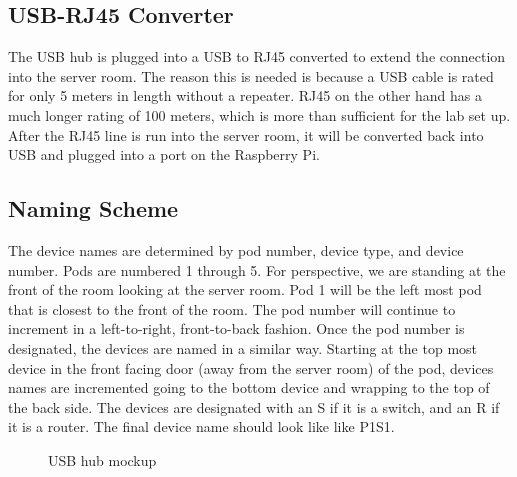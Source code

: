 \documentclass[12pt]{IEEEtran}
\begin{document}
\subsection{USB-RJ45 Converter}
The USB hub is plugged into a USB to RJ45 converted to extend the connection into the server room.
The reason this is needed is because a USB cable is rated for only 5 meters in length without a repeater.
RJ45 on the other hand has a much longer rating of 100 meters, which is more than sufficient for the lab set up.
After the RJ45 line is run into the server room, it will be converted back into USB and plugged into a port on the Raspberry Pi.

\subsection{Naming Scheme}
The device names are determined by pod number, device type, and device number.
Pods are numbered 1 through 5.
For perspective, we are standing at the front of the room looking at the server room.
Pod 1 will be the left most pod that is closest to the front of the room.
The pod number will continue to increment in a left-to-right, front-to-back fashion.
Once the pod number is designated, the devices are named in a similar way.
Starting at the top most device in the front facing door (away from the server room) of the pod, devices names are incremented going to the bottom device and wrapping to the top of the back side.
The devices are designated with an S if it is a switch, and an R if it is a router.
The final device name should look like like P1S1.


\begin{figure}[t]
	\centering
	\caption{USB hub mockup}

\end{figure}


\end{document}
